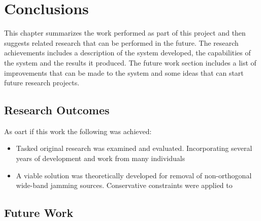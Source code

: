 \chapter{Conclusions}
\label{ch:conclusions}

This chapter summarizes the work performed as part of this project and then suggests related research that can be performed in the future. The research achievements includes a description of the system developed, the capabilities of the system and the results it produced. The future work section includes a list of improvements that can be made to the system and some ideas that can start future research projects.\\

\section{Research Outcomes}

As oart if this work the following was achieved:

\begin{itemize}

\item Tasked original research was examined and evaluated. Incorporating several years of development and work from many individuals

\item A viable solution was theoretically developed for removal of non-orthogonal wide-band jamming sources.  Conservative constraints were applied to 


\end{itemize}

\section{Future Work}


